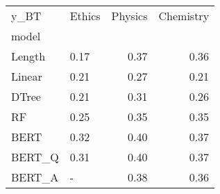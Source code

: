 \begin{tabular}{llrr}
\toprule
y\_BT & Ethics &  Physics &  Chemistry \\
model  &        &          &            \\
\midrule
Length &   0.17 &     0.37 &       0.36 \\
Linear &   0.21 &     0.27 &       0.21 \\
DTree  &   0.21 &     0.31 &       0.26 \\
RF     &   0.25 &     0.35 &       0.35 \\
BERT   &   0.32 &     0.40 &       0.37 \\
BERT\_Q &   0.31 &     0.40 &       0.37 \\
BERT\_A &      - &     0.38 &       0.36 \\
\bottomrule
\end{tabular}
